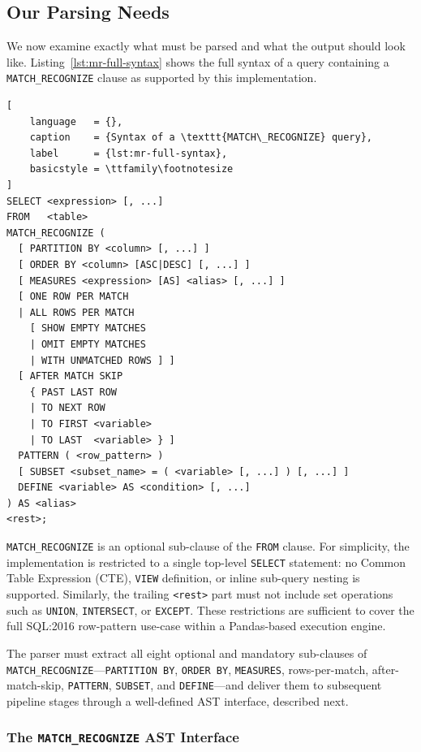 \subsection{Our Parsing Needs}
\label{subsec:meth-parsing-needs}

We now examine exactly what must be parsed and what the output
should look like.  Listing~\ref{lst:mr-full-syntax} shows the full syntax
of a query containing a \texttt{MATCH\_RECOGNIZE} clause as supported
by this implementation.

\begin{lstlisting}[
    language   = {},
    caption    = {Syntax of a \texttt{MATCH\_RECOGNIZE} query},
    label      = {lst:mr-full-syntax},
    basicstyle = \ttfamily\footnotesize
]
SELECT <expression> [, ...]
FROM   <table>
MATCH_RECOGNIZE (
  [ PARTITION BY <column> [, ...] ]
  [ ORDER BY <column> [ASC|DESC] [, ...] ]
  [ MEASURES <expression> [AS] <alias> [, ...] ]
  [ ONE ROW PER MATCH
  | ALL ROWS PER MATCH
    [ SHOW EMPTY MATCHES
    | OMIT EMPTY MATCHES
    | WITH UNMATCHED ROWS ] ]
  [ AFTER MATCH SKIP
    { PAST LAST ROW
    | TO NEXT ROW
    | TO FIRST <variable>
    | TO LAST  <variable> } ]
  PATTERN ( <row_pattern> )
  [ SUBSET <subset_name> = ( <variable> [, ...] ) [, ...] ]
  DEFINE <variable> AS <condition> [, ...]
) AS <alias>
<rest>;
\end{lstlisting}

\texttt{MATCH\_RECOGNIZE} is an optional sub-clause of the
\texttt{FROM} clause.  For simplicity, the implementation is
restricted to a single top-level \texttt{SELECT} statement:
no Common Table Expression (CTE), \texttt{VIEW} definition, or
inline sub-query nesting is supported.  Similarly, the trailing
\texttt{<rest>} part must not include set operations such as
\texttt{UNION}, \texttt{INTERSECT}, or \texttt{EXCEPT}.  These
restrictions are sufficient to cover the full SQL:2016 row-pattern
use-case within a Pandas-based execution engine.

The parser must extract all eight optional and mandatory
sub-clauses of \texttt{MATCH\_RECOGNIZE}---\texttt{PARTITION~BY},
\texttt{ORDER~BY}, \texttt{MEASURES}, rows-per-match,
after-match-skip, \texttt{PATTERN}, \texttt{SUBSET}, and
\texttt{DEFINE}---and deliver them to subsequent pipeline stages
through a well-defined AST interface, described next.

\subsubsection{The \texttt{MATCH\_RECOGNIZE} AST Interface}
\label{subsubsec:meth-ast-interface}

